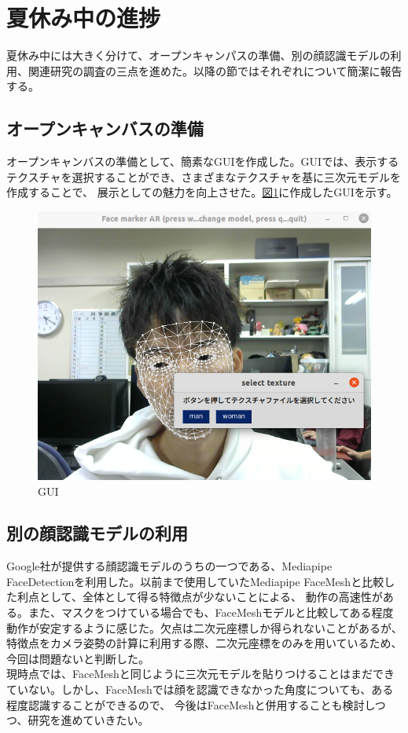 \documentclass[]{jarticle}          %
\begin{document}
\section{夏休み中の進捗}
夏休み中には大きく分けて、オープンキャンパスの準備、別の顔認識モデルの利用、関連研究の調査の三点を進めた。以降の節ではそれぞれについて簡潔に報告する。

\subsection{オープンキャンバスの準備}
オープンキャンバスの準備として、簡素なGUIを作成した。GUIでは、表示するテクスチャを選択することができ、さまざまなテクスチャを基に三次元モデルを作成することで、
展示としての魅力を向上させた。\hyperref[five]{図\ref{five}}に作成したGUIを示す。
\begin{figure}[!ht]
 \begin{center}
    \includegraphics[scale=0.5]{figures/gui.png}
    \caption{GUI}
    \label{five}
  \end{center}
\end{figure}
\subsection{別の顔認識モデルの利用}
Google社が提供する顔認識モデルのうちの一つである、Mediapipe FaceDetectionを利用した。以前まで使用していたMediapipe FaceMeshと比較した利点として、全体として得る特徴点が少ないことによる、
動作の高速性がある。また、マスクをつけている場合でも、FaceMeshモデルと比較してある程度動作が安定するように感じた。欠点は二次元座標しか得られないことがあるが、
特徴点をカメラ姿勢の計算に利用する際、二次元座標をのみを用いているため、今回は問題ないと判断した。\\
現時点では、FaceMeshと同じように三次元モデルを貼りつけることはまだできていない。しかし、FaceMeshでは顔を認識できなかった角度についても、ある程度認識することができるので、
今後はFaceMeshと併用することも検討しつつ、研究を進めていきたい。
\end{document}
